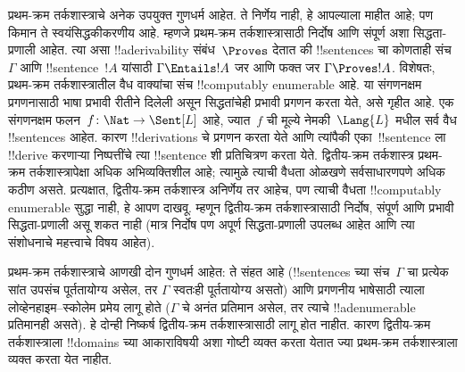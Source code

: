 \documentclass[../../../include/open-logic-section]{subfiles}
\begin{document}


प्रथम-क्रम तर्कशास्त्राचे अनेक उपयुक्त गुणधर्म आहेत. ते निर्णेय नाही,
हे आपल्याला माहीत आहे; पण किमान ते स्वयंसिद्धकीकरणीय आहे. म्हणजे
प्रथम-क्रम तर्कशास्त्रासाठी निर्दोष आणि संपूर्ण अशा सिद्धता-प्रणाली
आहेत. त्या असा !!a{derivability} संबंध~$\Proves$ देतात की
!!{sentence}s चा कोणताही संच~$\Gamma$ आणि !!{sentence}~$!A$
यांसाठी $\Gamma \Entails !A$ जर आणि फक्त जर
$\Gamma \Proves !A$. विशेषतः, प्रथम-क्रम तर्कशास्त्रातील
वैध वाक्यांचा संच !!{computably
  enumerable} आहे. या संगणनक्षम प्रगणनासाठी भाषा प्रभावी रीतीने
दिलेली असून सिद्धतांचेही प्रभावी प्रगणन करता येते, असे गृहीत आहे. एक संगणनक्षम फलन~$f\colon \Nat \to
\Sent[L]$ आहे, ज्यात~$f$ ची मूल्ये नेमकी~$\Lang{L}$ मधील सर्व
वैध !!{sentence}s आहेत. कारण !!{derivation}s चे प्रगणन
करता येते आणि त्यांपैकी एका~!!{sentence} ला !!{derive}
करणाऱ्या निष्पत्तींचे त्या !!{sentence} शी प्रतिचित्रण
करता येते. द्वितीय-क्रम तर्कशास्त्र प्रथम-क्रम तर्कशास्त्रापेक्षा
अधिक अभिव्यक्तिशील आहे; त्यामुळे त्याची वैधता ओळखणे
सर्वसाधारणपणे अधिक कठीण असते. प्रत्यक्षात, द्वितीय-क्रम
तर्कशास्त्र अनिर्णेय तर आहेच, पण त्याची वैधता
!!{computably
  enumerable} सुद्धा नाही, हे आपण दाखवू. म्हणून
द्वितीय-क्रम तर्कशास्त्रासाठी निर्दोष, संपूर्ण आणि प्रभावी
सिद्धता-प्रणाली असू शकत नाही (मात्र निर्दोष पण अपूर्ण सिद्धता-प्रणाली उपलब्ध
आहेत आणि त्या संशोधनाचे महत्त्वाचे विषय आहेत).

प्रथम-क्रम तर्कशास्त्राचे आणखी दोन गुणधर्म आहेत: ते संहत
आहे (!!{sentence}s च्या संच~$\Gamma$ चा प्रत्येक सांत उपसंच
पूर्ततायोग्य असेल, तर $\Gamma$ स्वतःही पूर्ततायोग्य असतो)
आणि प्रगणनीय भाषेसाठी त्याला लोव्हेनहाइम--स्कोलेम प्रमेय लागू होते
($\Gamma$ चे अनंत प्रतिमान असेल, तर त्याचे
!!a{denumerable} प्रतिमानही असते). हे दोन्ही निष्कर्ष
द्वितीय-क्रम तर्कशास्त्रासाठी लागू होत नाहीत. कारण
द्वितीय-क्रम तर्कशास्त्राला !!{domain}s च्या आकाराविषयी
अशा गोष्टी व्यक्त करता येतात ज्या प्रथम-क्रम तर्कशास्त्राला
व्यक्त करता येत नाहीत.
\end{document}
